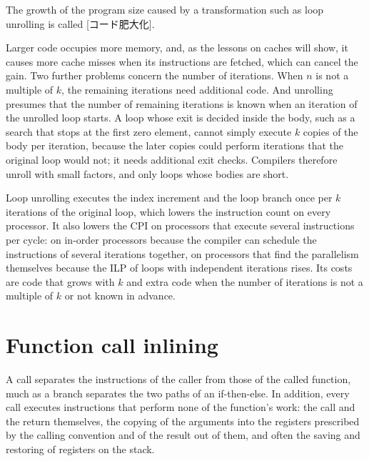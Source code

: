 \documentclass[../main.tex]{subfiles}
\begin{document}
\begin{definition}
  \label{def:l10-bloat}
  The growth of the program size caused by a transformation such as loop
  unrolling is called [コード肥大化].
\end{definition}

Larger code occupies more memory, and, as the lessons on caches will show, it
causes more cache misses when its instructions are fetched, which can cancel
the gain.  Two further problems concern the
number of iterations.  When $n$ is not a multiple of $k$, the remaining
iterations need additional code.  And
unrolling presumes that the number of remaining iterations is known when an
iteration of the unrolled loop starts.  A loop whose exit is decided inside
the body, such as a search that stops at the first zero element, cannot
simply execute $k$ copies of the body per iteration, because the later copies
could perform iterations that the original loop would not; it needs additional
exit checks.  Compilers therefore unroll with small factors, and only loops
whose bodies are short.

\begin{keypoint}
  Loop unrolling executes the index increment and the loop branch once per $k$
  iterations of the original loop, which lowers the instruction count on every
  processor.  It also lowers the CPI on processors that execute several
  instructions per cycle: on in-order processors because the compiler can
  schedule the instructions of several iterations together, on processors
  that find the parallelism themselves because the ILP of loops with
  independent iterations rises.  Its costs are code that grows with $k$ and
  extra code when the number of iterations is not a multiple of $k$ or not
  known in advance.
\end{keypoint}

\section{Function call inlining}
\label{sec:l10-inlining}

A call separates the instructions of the caller from those of the called
function, much as a branch separates the two paths of an
if-then-else.  In addition,
every call executes instructions that perform none of the function's work: the
call and the return themselves, the copying of the arguments into the
registers prescribed by the calling convention and of the result out of them,
and often the saving and restoring of registers on the stack.
\end{document}
